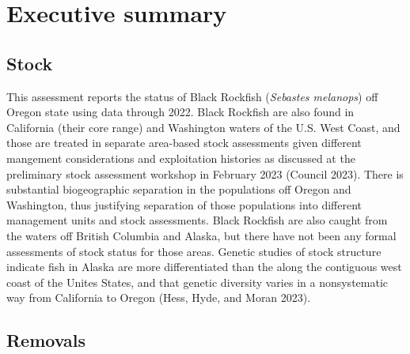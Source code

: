 \documentclass[11pt,
  english,
  letterpaper,
]{article}
\begin{document}
\newcommand{\lt}{\ensuremath <}
\newcommand{\gt}{\ensuremath >}

\vspace{500cm}

\pagebreak
{}
\setcounter{page}{1}

\renewcommand{\thetable}{\roman{table}}
\renewcommand{\thefigure}{\roman{figure}}

\setlength\parskip{0.5em plus 0.1em minus 0.2em}

\hypertarget{executive-summary}{%
\section*{Executive summary}\label{executive-summary}}

\hypertarget{stock}{%
\subsection*{Stock}\label{stock}}

This assessment reports the status of Black Rockfish (\emph{Sebastes melanops}) off Oregon state using data through 2022. Black Rockfish are also found in California (their core range) and Washington waters of the U.S. West Coast, and those are treated in separate area-based stock assessments given different mangement considerations and exploitation histories as discussed at the preliminary stock assessment workshop in February 2023 (Council 2023). There is substantial biogeographic separation in the populations off Oregon and Washington, thus justifying separation of those populations into different management units and stock assessments. Black Rockfish are also caught from the waters off British Columbia and Alaska, but there have not been any formal assessments of stock status for those areas. Genetic studies of stock structure indicate fish in Alaska are more differentiated than the along the contiguous west coast of the Unites States, and that genetic diversity varies in a nonsystematic way from California to Oregon (Hess, Hyde, and Moran 2023).

\hypertarget{removals}{%
\subsection*{Removals}\label{removals}}
\end{document}
